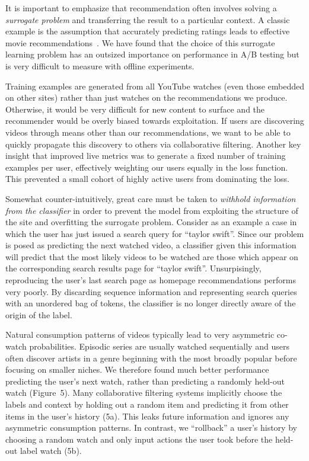 It is important to emphasize that recommendation often involves solving a
\textit{surrogate problem} and transferring the result to a particular
context. A classic example is the assumption that accurately predicting
ratings leads to effective movie recommendations~\cite{amatriain2012building}.
We have found that the choice of this surrogate learning problem has an
outsized importance on performance in A/B testing but is very difficult to
measure with offline experiments.

Training examples are generated from all YouTube watches (even those
embedded on other sites) rather than just watches on the recommendations we
produce. Otherwise, it would be very difficult for new content to surface and
the recommender would be overly biased towards exploitation. If users are
discovering videos through means other than our recommendations, we want to
be able to quickly propagate this discovery to others via collaborative
filtering. Another key insight that improved live metrics was to generate a
fixed number of training examples per user, effectively weighting our users
equally in the loss function. This prevented a small cohort of highly active
users from dominating the loss.

Somewhat counter-intuitively, great care must be taken to \textit{withhold
information from the classifier} in order to prevent the model from
exploiting the structure of the site and overfitting the surrogate problem.
Consider as an example a case in which the user has just issued a search
query for ``taylor swift''. Since our problem is posed as predicting the next
watched video, a classifier given this information will predict that the
most likely videos to be watched are those which appear on the corresponding
search results page for ``taylor swift''. Unsurpisingly, reproducing the
user's last search page as homepage recommendations performs very poorly. By
discarding sequence information and representing search queries with an
unordered bag of tokens, the classifier is no longer directly aware of the
origin of the label.

Natural consumption patterns of videos typically lead to very asymmetric
co-watch probabilities. Episodic series are usually watched sequentially and
users often discover artists in a genre beginning with the most broadly
popular before focusing on smaller niches. We therefore found much better
performance predicting the user's next watch, rather than predicting a
randomly held-out watch (Figure~5). Many collaborative filtering systems
implicitly choose the labels and context by holding out a random item and
predicting it from other items in the user's history (5a). This leaks future
information and ignores any asymmetric consumption patterns. In contrast, we
``rollback'' a user's history by choosing a random watch and only input
actions the user took before the held-out label watch (5b).

